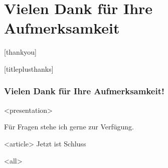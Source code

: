 \section{Vielen Dank für Ihre Aufmerksamkeit}
{%
{[thankyou]%
{[titleplusthanks]%
\begin{frame}[fragile]
\frametitle{Vielen Dank für Ihre Aufmerksamkeit!}




\mode
<presentation>

\begin{flushright}
\vskip-2.3cm
Für Fragen stehe ich gerne zur Verfügung.
\end{flushright}

\mode
<article>
Jetzt ist Schluss


\mode
<all>

\end{frame}
}
}
}

\newpage
\clearpage
